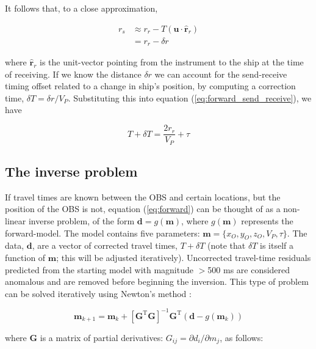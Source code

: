 It follows that, to a close approximation,

\begin{align*}
r_s &\approx r_r - T \left(\mathbf{u} \cdot \mathbf{\hat{r}}_r \right)\\
	&= r_r - \delta r
\end{align*}

where $\mathbf{\hat{r}}_r$ is the unit-vector pointing from the instrument to the ship at the time of receiving. If we know the  distance $\delta r$ we can account for the send-receive timing offset related to a change in ship's position, by computing a correction time, $\delta T = \delta r/V_P$. Substituting this into equation (\ref{eq:forward_send_receive}), we have

\begin{equation}
T + \delta T = \frac{2 r_r}{V_P} + \tau \label{eq:forward}
\end{equation}

\subsection{The inverse problem}

If travel times are known between the OBS and certain locations, but the position of the OBS is not, equation (\ref{eq:forward}) can be thought of as a non-linear inverse problem, of the form $ \mathbf{d} = g(\mathbf{m})$, where $g(\mathbf{m})$ represents the forward-model. The model contains five parameters: $\mathbf{m} = \{x_O,y_O,z_O,V_P,\tau\}$. The data, $\mathbf{d}$, are a vector of corrected travel times, $T+\delta T$ (note that $\delta T$ is itself a function of $\mathbf{m}$; this will be adjusted iteratively). Uncorrected travel-time residuals predicted from the starting model with magnitude $>$500 ms are considered anomalous and are removed before beginning the inversion. This type of problem can be solved iteratively using Newton's method \citep{William:2012vh,Menke:1984vh}:

\begin{equation}
	\mathbf{m}_{k+1} = \mathbf{m}_k + \left[\mathbf{G}^{\text{T}} \mathbf{G}\right]^{-1} \mathbf{G}^{\text{T}} \left(\mathbf{d} - g(\mathbf{m}_k)\right)
\end{equation}

where $\mathbf{G}$ is a matrix of partial derivatives: $G_{ij} = \partial d_i/\partial m_j$, as follows:

